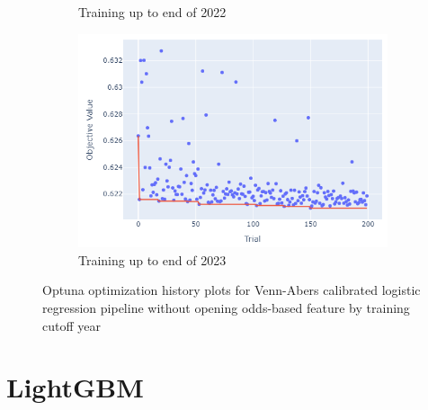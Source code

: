 \documentclass[12pt,twoside]{report}
\begin{document}
\begin{figure}[htb]
\begin{subfigure}{.33\linewidth}
  \caption{Training up to end of 2022}
\end{subfigure}%
\begin{subfigure}{.33\linewidth}
  \centering
  \includegraphics[width=0.95\linewidth]{figures/va_lr_no_odds_cutoff_2023.png}
  \caption{Training up to end of 2023}
\end{subfigure}
\par\bigskip
\caption{Optuna optimization history plots for Venn-Abers calibrated logistic regression pipeline without opening odds-based feature by training cutoff year}
\end{figure}

\newpage
\section{LightGBM}
\end{document}
